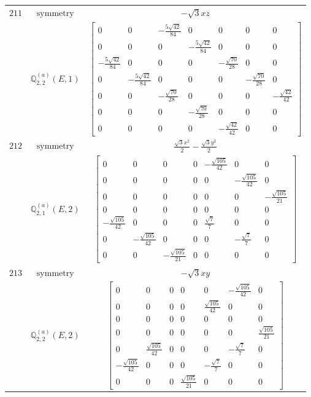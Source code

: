 \documentclass[fleqn,8pt,landscape]{jsarticle}
\begin{document}
\begin{longtable}{ccc}
$ 211 $ & $ \text{symmetry} $ & $ - \sqrt{3} x z $ \\
$  $ & $ \mathbb{Q}_{2,2}^{(a)}(E,1) $ & $ \begin{bmatrix} 0 & 0 & - \frac{5 \sqrt{42}}{84} & 0 & 0 & 0 & 0 \\ 0 & 0 & 0 & - \frac{5 \sqrt{42}}{84} & 0 & 0 & 0 \\ - \frac{5 \sqrt{42}}{84} & 0 & 0 & 0 & - \frac{\sqrt{70}}{28} & 0 & 0 \\ 0 & - \frac{5 \sqrt{42}}{84} & 0 & 0 & 0 & - \frac{\sqrt{70}}{28} & 0 \\ 0 & 0 & - \frac{\sqrt{70}}{28} & 0 & 0 & 0 & - \frac{\sqrt{42}}{42} \\ 0 & 0 & 0 & - \frac{\sqrt{70}}{28} & 0 & 0 & 0 \\ 0 & 0 & 0 & 0 & - \frac{\sqrt{42}}{42} & 0 & 0 \end{bmatrix} $ \\ \hline
$ 212 $ & $ \text{symmetry} $ & $ \frac{\sqrt{3} x^{2}}{2} - \frac{\sqrt{3} y^{2}}{2} $ \\
$  $ & $ \mathbb{Q}_{2,1}^{(a)}(E,2) $ & $ \begin{bmatrix} 0 & 0 & 0 & 0 & - \frac{\sqrt{105}}{42} & 0 & 0 \\ 0 & 0 & 0 & 0 & 0 & - \frac{\sqrt{105}}{42} & 0 \\ 0 & 0 & 0 & 0 & 0 & 0 & - \frac{\sqrt{105}}{21} \\ 0 & 0 & 0 & 0 & 0 & 0 & 0 \\ - \frac{\sqrt{105}}{42} & 0 & 0 & 0 & \frac{\sqrt{7}}{7} & 0 & 0 \\ 0 & - \frac{\sqrt{105}}{42} & 0 & 0 & 0 & - \frac{\sqrt{7}}{7} & 0 \\ 0 & 0 & - \frac{\sqrt{105}}{21} & 0 & 0 & 0 & 0 \end{bmatrix} $ \\ \hline
$ 213 $ & $ \text{symmetry} $ & $ - \sqrt{3} x y $ \\
$  $ & $ \mathbb{Q}_{2,2}^{(a)}(E,2) $ & $ \begin{bmatrix} 0 & 0 & 0 & 0 & 0 & - \frac{\sqrt{105}}{42} & 0 \\ 0 & 0 & 0 & 0 & \frac{\sqrt{105}}{42} & 0 & 0 \\ 0 & 0 & 0 & 0 & 0 & 0 & 0 \\ 0 & 0 & 0 & 0 & 0 & 0 & \frac{\sqrt{105}}{21} \\ 0 & \frac{\sqrt{105}}{42} & 0 & 0 & 0 & - \frac{\sqrt{7}}{7} & 0 \\ - \frac{\sqrt{105}}{42} & 0 & 0 & 0 & - \frac{\sqrt{7}}{7} & 0 & 0 \\ 0 & 0 & 0 & \frac{\sqrt{105}}{21} & 0 & 0 & 0 \end{bmatrix} $ \\ \hline

\end{longtable}
\end{document}
